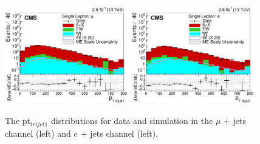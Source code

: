 
    
\begin{figure}[ht!]
    \includegraphics[width=0.48\textwidth]{images/Run2/bestTopPt_StackLogY.pdf}
    \includegraphics[width=0.48\textwidth]{images/Run2/bestTopPt_StackLogY_e.pdf}
    \caption{The pt$_{trijet1}$ distributions for data and simulation in the $\mu$ + jets channel (left) and $e$ + jets channel (left).}
    \label{fig:bestTopPt}
\end{figure}
   

